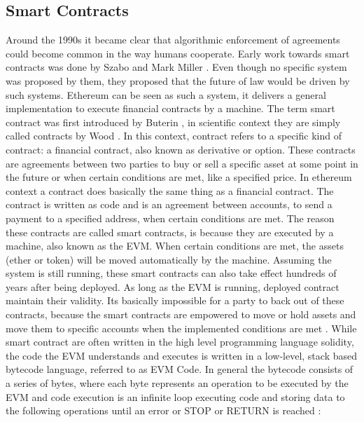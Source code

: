\subsection{Smart Contracts}
\label{subsec:background:first_section:first_subsection}
Around the 1990s it became clear that algorithmic enforcement of agreements could become common in the way humans cooperate. Early work towards smart contracts was done by Szabo \cite{szabo1997formalizing} and Mark Miller \cite{miller1997future}. Even though no specific system was proposed by them, they proposed that the future of law would be driven by such systems. Ethereum can be seen as such a system, it delivers a general implementation to execute financial contracts by a machine. The term smart contract was first introduced by Buterin \cite{buterin2013ethereum}, in scientific context they are simply called contracts by Wood \cite{wood2014ethereum}. In this context, contract refers to a specific kind of contract: a financial contract, also known as derivative or option. These contracts are agreements between two parties to buy or sell a specific asset at some point in the future or when certain conditions are met, like a specified price. In ethereum context a contract does basically the same thing as a financial contract. The contract is written as code and is an agreement between accounts, to send a payment to a specified address, when certain conditions are met. The reason these contracts are called smart contracts, is because they are executed by a machine, also known as the \ac{EVM}. When certain conditions are met, the assets (ether or token) will be moved automatically by the machine. Assuming the system is still running, these smart contracts can also take effect hundreds of years after being deployed. As long as the \ac{EVM} is running, deployed contract maintain their validity. Its basically impossible for a party to back out of these contracts, because the smart contracts are empowered to move or hold assets and move them to specific accounts when the implemented conditions are met \cite{dannen2017introducing}. While smart contract are often written in the high level programming language solidity, the code the \ac{EVM} understands and executes is written in a low-level, stack based bytecode language, referred to as \ac{EVM Code}. In general the bytecode consists of a series of bytes, where each byte represents an operation to be executed by the \ac{EVM} and code execution is an infinite loop executing code and storing data to the following operations until an error or STOP or RETURN is reached \cite{buterin2013ethereum}:

